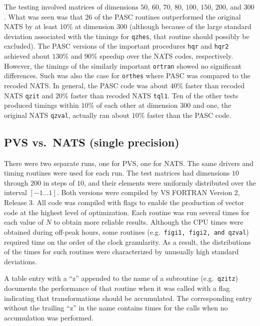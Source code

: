 The testing involved matrices of dimensions $50$, $60$, $70$, $80$,
$100$, $150$, $200$, and $300$. What was seen was that $26$ of the PASC 
routines outperformed the original NATS by at least $10$\% at dimension $300$
(although because of the large standard deviation associated with the
timings for {\tt qzhes}, that routine should possibly be excluded).
The PASC versions of the important procedures
{\tt hqr} and {\tt hqr2} achieved about $130$\%
and $90$\% speedup over the NATS codes, respectively.
However, the timings of the
similarly important {\tt ortran} showed no significant differences.
Such was also the case for {\tt orthes} where PASC was compared to
the recoded NATS. In general, the PASC code was about $40$\% faster
than recoded NATS {\tt qzit} and $20$\% faster than recoded NATS {\tt tql1}.
Ten of the other tests produced timings within $10$\% of each
other at dimension $300$ and one, the original NATS {\tt qzval},
actually ran about $10$\% faster than the PASC code.

\subsection{PVS vs.\ NATS (single precision)}
There were two separate runs, one for PVS, one for NATS.
The same drivers and timing routines were used for each run.
The test matrices had dimensions $10$ through $200$ in steps of $10$,
and their elements were uniformly distributed over the interval
$[-1 \ldots 1]$.
Both versions were compiled by VS FORTRAN Version 2, Release 3.
All code was compiled with flags to enable the production of
vector code at the highest level of optimization.
Each routine was run several times for each value of $N$ to
obtain more reliable results.
Although the CPU times were obtained during off-peak hours,
some routines (e.g.\ {\tt figi1, figi2, and qzval}) required
time on the order of the clock granularity.
As a result, the distributions of the times for such routines were
characterized by unusually high standard deviations.

A table entry with a ``z'' appended to the
name of a subroutine (e.g.\ {\tt qzitz}) documents the performance
of that routine when it was called with a flag indicating that
transformations should be accumulated.  The corresponding entry
without the trailing ``z'' in the name contains times for the
calls when no accumulation was performed.


